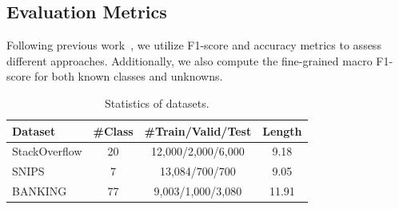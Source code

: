 \documentclass[letterpaper]{article} %
\theoremstyle{definition}
\begin{document}
\subsection{Evaluation Metrics}
Following previous work~\cite{zhang2021deep}, we utilize F1-score and accuracy metrics to assess different approaches. Additionally, we also compute the fine-grained macro F1-score for both known classes and unknowns.
\begin{table}[t]
\centering
 
\begin{tabular}{lccc}

\hline
Dataset &\#Class&\#Train/Valid/Test&Length\\
\hline
StackOverflow & 20 &12,000/2,000/6,000&9.18 \\
SNIPS         & 7  &13,084/700/700&9.05 \\
BANKING       & 77 &9,003/1,000/3,080&11.91 \\
\hline
\end{tabular}
\caption{Statistics of datasets.}
\label{tab:1}
\end{table}
\end{document}
